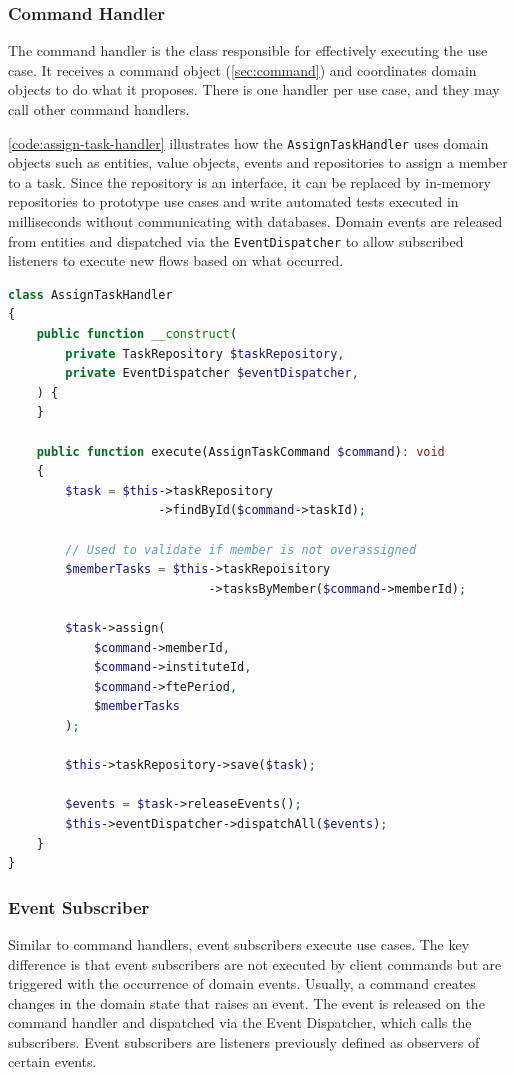 \subsubsection{Command Handler}
\label{sec:command-handler}

The command handler is the class responsible for effectively executing the use case. It receives a command object (\autoref{sec:command}) and coordinates domain objects to do what it proposes. There is one handler per use case, and they may call other command handlers.

\autoref{code:assign-task-handler} illustrates how the \texttt{AssignTaskHandler} uses domain objects such as entities, value objects, events and repositories to assign a member to a task. Since the repository is an interface, it can be replaced by in-memory repositories to prototype use cases and write automated tests executed in milliseconds without communicating with databases. Domain events are released from entities and dispatched via the \texttt{EventDispatcher} to allow subscribed listeners to execute new flows based on what occurred.

\begin{lstlisting}[language=PHP,label={code:assign-task-handler},caption={Example of the \texttt{AssignTask} command handler.}]
class AssignTaskHandler
{
	public function __construct(
		private TaskRepository $taskRepository,
		private EventDispatcher $eventDispatcher,
	) {
	}

	public function execute(AssignTaskCommand $command): void
	{
		$task = $this->taskRepository
                     ->findById($command->taskId);

		// Used to validate if member is not overassigned
		$memberTasks = $this->taskRepoisitory
                            ->tasksByMember($command->memberId);
		
		$task->assign(
			$command->memberId,
			$command->instituteId,
			$command->ftePeriod,
			$memberTasks
		);

		$this->taskRepository->save($task);

		$events = $task->releaseEvents();
		$this->eventDispatcher->dispatchAll($events);
	}
}
\end{lstlisting}

\subsubsection{Event Subscriber}
\label{sec:event-subscriber}

Similar to command handlers, event subscribers execute use cases. The key difference is that event subscribers are not executed by client commands but are triggered with the occurrence of domain events. Usually, a command creates changes in the domain state that raises an event. The event is released on the command handler and dispatched via the Event Dispatcher, which calls the subscribers. Event subscribers are listeners previously defined as observers of certain events.

